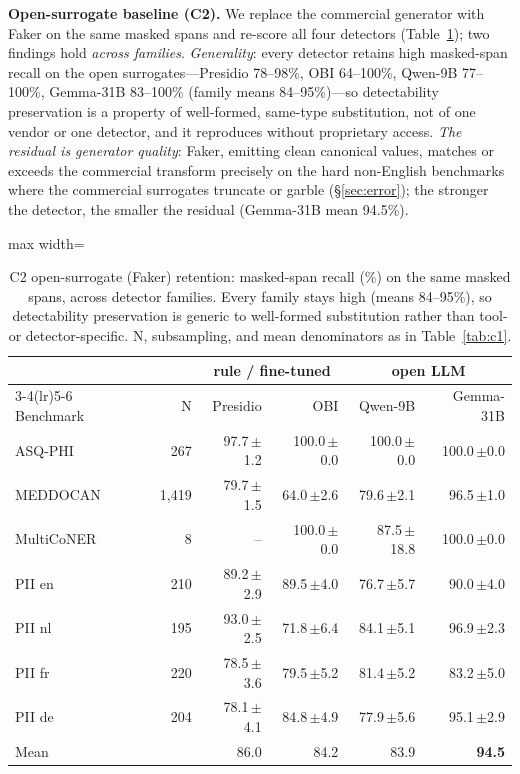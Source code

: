 \documentclass[11pt]{article}
\newcommand{\nk}[1]{{\footnotesize\textcolor{ckhaki}{#1}}}
\newcommand{\vc}[2]{#1\,{\scriptsize\textcolor{ckhaki}{$\pm$#2}}}
\begin{document}
\textbf{Open-surrogate baseline (C2).} We replace the commercial generator with Faker on the same masked spans and re-score all four detectors (Table~\ref{tab:c2}); two findings hold \emph{across families}. \emph{Generality}: every detector retains high masked-span recall on the open surrogates---Presidio 78--98\%, OBI 64--100\%, Qwen-9B 77--100\%, Gemma-31B 83--100\% (family means 84--95\%)---so detectability preservation is a property of well-formed, same-type substitution, not of one vendor or one detector, and it reproduces without proprietary access. \emph{The residual is generator quality}: Faker, emitting clean canonical values, matches or exceeds the commercial transform precisely on the hard non-English benchmarks where the commercial surrogates truncate or garble (\S\ref{sec:error}); the stronger the detector, the smaller the residual (Gemma-31B mean 94.5\%).

\begin{table}[t]\centering\small
\begin{adjustbox}{max width=\columnwidth}%
\begin{tabular}{lrrrrr}
\toprule
 & & \multicolumn{2}{c}{rule / fine-tuned} & \multicolumn{2}{c}{open LLM}\\
\cmidrule(lr){3-4}\cmidrule(lr){5-6}
Benchmark & \nk{N} & Presidio & OBI & Qwen-9B & Gemma-31B\\
\midrule
ASQ-PHI & \nk{267} & \vc{97.7}{1.2} & \vc{100.0}{0.0} & \vc{100.0}{0.0} & \vc{100.0}{0.0}\\
MEDDOCAN & \nk{1{,}419} & \vc{79.7}{1.5} & \vc{64.0}{2.6} & \vc{79.6}{2.1} & \vc{96.5}{1.0}\\
MultiCoNER & \nk{8} & -- & \vc{100.0}{0.0} & \vc{87.5}{18.8} & \vc{100.0}{0.0}\\
PII en & \nk{210} & \vc{89.2}{2.9} & \vc{89.5}{4.0} & \vc{76.7}{5.7} & \vc{90.0}{4.0}\\
PII nl & \nk{195} & \vc{93.0}{2.5} & \vc{71.8}{6.4} & \vc{84.1}{5.1} & \vc{96.9}{2.3}\\
PII fr & \nk{220} & \vc{78.5}{3.6} & \vc{79.5}{5.2} & \vc{81.4}{5.2} & \vc{83.2}{5.0}\\
PII de & \nk{204} & \vc{78.1}{4.1} & \vc{84.8}{4.9} & \vc{77.9}{5.6} & \vc{95.1}{2.9}\\
\midrule
Mean & & 86.0 & 84.2 & 83.9 & \textbf{94.5}\\
\bottomrule
\end{tabular}
\end{adjustbox}
\caption{C2 open-surrogate (Faker) retention: masked-span recall (\%) on the same masked spans, across detector families. Every family stays high (means 84--95\%), so detectability preservation is generic to well-formed substitution rather than tool- or detector-specific. \nk{N}, subsampling, and mean denominators as in Table~\ref{tab:c1}.}\label{tab:c2}
\end{table}
\end{document}
